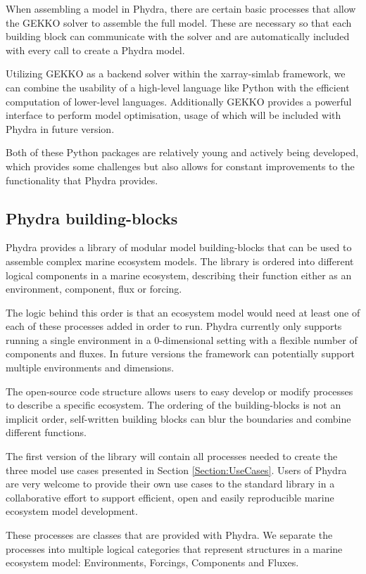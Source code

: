 \documentclass[template.tex]{subfiles}
\begin{document}
When assembling a model in Phydra, there are certain basic processes that allow the GEKKO solver to assemble the full model. These are necessary so that each building block can communicate with the solver and are automatically included with every call to create a Phydra model.

Utilizing GEKKO as a backend solver within the xarray-simlab framework, we can combine the usability of a high-level language like Python with the efficient computation of lower-level languages. Additionally GEKKO provides a powerful interface to perform model optimisation, usage of which will be included with Phydra in future version. 

Both of these Python packages are relatively young and actively being developed, which provides some challenges but also allows for constant improvements to the functionality that Phydra provides.


\subsection{Phydra building-blocks}

Phydra provides a library of modular model building-blocks that can be used to assemble complex marine ecosystem models. The library is ordered into different logical components in a marine ecosystem, describing their function either as an environment, component, flux or forcing. 

The logic behind this order is that an ecosystem model would need at least one of each of these processes added in order to run. Phydra currently only supports running a single environment in a 0-dimensional setting with a flexible number of components and fluxes. In future versions the framework can potentially support multiple environments and dimensions.

The open-source code structure allows users to easy develop or modify processes to describe a specific ecosystem. The ordering of the building-blocks is not an implicit order, self-written building blocks can blur the boundaries and combine different functions.

The first version of the library will contain all processes needed to create the three model use cases presented in Section \ref{Section:UseCases}. Users of Phydra are very welcome to provide their own use cases to the standard library in a collaborative effort to support efficient, open and easily reproducible marine ecosystem model development.

These processes are classes that are provided with Phydra. We separate the processes into multiple logical categories that represent structures in a marine ecosystem model: Environments, Forcings, Components and Fluxes.
\end{document}
